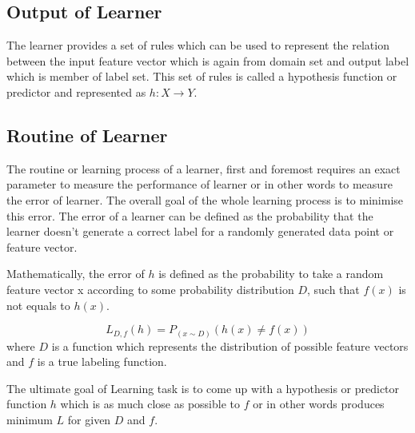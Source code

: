 \documentclass[a4paper]{article}
\begin{document}
\subsection{Output of Learner}
The learner provides a set of rules which can be used to represent the relation between the input feature vector which is again from domain set and output label which is member of label set. This set of rules is called a hypothesis function or predictor and represented as $h : X \rightarrow Y $. 

\subsection{Routine of Learner}
The routine or learning process of a learner, first and foremost requires an exact parameter to measure the performance of learner or in other words to measure the error of learner. The overall goal of the whole learning process is to minimise this error. The error of a learner can be defined as the probability that the learner doesn't generate a correct label for a randomly generated data point or feature vector. 

Mathematically, the error of $h$ is defined as the probability to take a random feature vector x according to some probability distribution $D$, such that $f(x)$ is not equals to $h(x)$. 

$$ L_{D,f}(h) = P_{(x \sim D)}(h(x) \neq f(x) )  $$
where $D$ is a function which represents the distribution of possible feature vectors and $f$ is a true labeling function. 

The ultimate goal of Learning task is to come up with a hypothesis or predictor function $h$ which is as much close as possible to $f$ or in other words produces minimum $L$ for given $D$ and $f$. 
\end{document}
